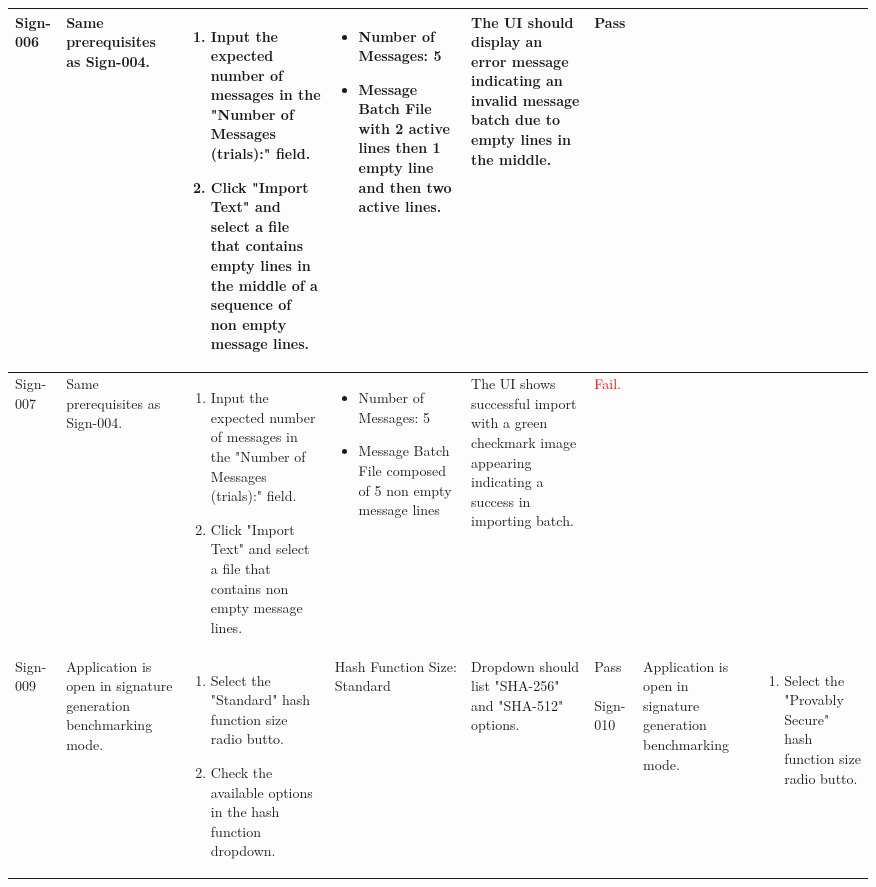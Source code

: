 \documentclass[]{final_report}
\theoremstyle{definition}
\begin{document}
\begin{longtable}{|l|p{2.5cm}|p{2.8cm}|p{3cm}|p{2cm}|p{1.5cm}|}
  Sign-006 & Same prerequisites as Sign-004. & 
  \begin{enumerate}
    \item Input the expected number of messages in the "Number of Messages (trials):" field.
    \item Click "Import Text" and select a file that contains empty lines in the middle of a sequence of non empty message lines.
  \end{enumerate} & 
  \begin{itemize}
    \item Number of Messages: 5
    \item Message Batch File with 2 active lines then 1 empty line and then two active lines.
  \end{itemize}
  & The UI should display an error message indicating an invalid message batch due to empty lines in the middle. & Pass \\
  \hline
 Sign-007 & Same prerequisites as Sign-004. & 
  \begin{enumerate}
    \item Input the expected number of messages in the "Number of Messages (trials):" field.
    \item Click "Import Text" and select a file that contains non empty message lines.
  \end{enumerate} & 
  \begin{itemize}
    \item Number of Messages: 5
    \item Message Batch File composed of 5 non empty message lines
  \end{itemize}
  & The UI shows successful import with a green checkmark image appearing indicating a success in importing batch. & \textcolor{red}{Fail.} \\
  \hline
  Sign-009 & Application is open in signature generation benchmarking mode. &
\begin{enumerate}
\item Select the "Standard" hash function size radio butto.
\item Check the available options in the hash function dropdown.
\end{enumerate} & Hash Function Size: Standard & Dropdown should list "SHA-256" and "SHA-512" options. & Pass \
\hline
Sign-010 & Application is open in signature generation benchmarking mode. &
\begin{enumerate}
\item Select the "Provably Secure" hash function size radio butto.

\end{enumerate}
\end{longtable}
\end{document}

